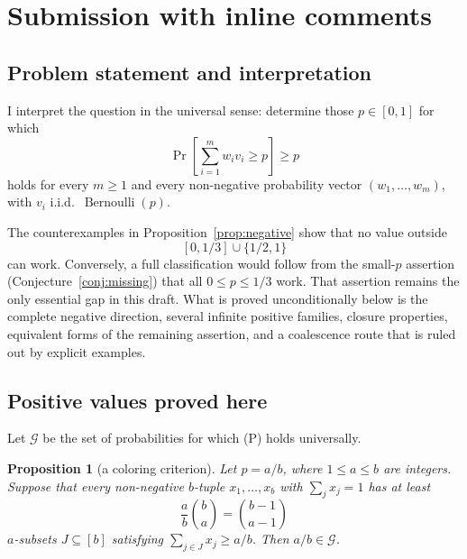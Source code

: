 \documentclass[12pt]{article}
\newtheorem{proposition}{Proposition}
\newcommand{\Ber}{\operatorname{Bernoulli}}
\begin{document}
  \section{Submission with inline comments}


\date{}

\subsection*{Problem statement and interpretation}

I interpret the question in the universal sense: determine those \(p\in[0,1]\)
for which
\[
        \Pr\!\left[\sum_{i=1}^m w_i v_i\ge p\right]\ge p                  \tag{P}
\]
holds for every \(m\ge1\) and every non-negative probability vector
\((w_1,\ldots,w_m)\), with \(v_i\) i.i.d.\ \(\Ber(p)\).

The counterexamples in Proposition~\ref{prop:negative} show that no value
outside
\[
        [0,1/3]\cup\{1/2,1\}
\]
can work.  Conversely, a full classification would follow from the
small-\(p\) assertion (Conjecture~\ref{conj:missing}) that all
\(0\le p\le1/3\) work.  That assertion remains the only essential gap in this
draft.  What is proved unconditionally below is the complete negative direction,
several infinite positive families, closure properties, equivalent forms of the
remaining assertion, and a coalescence route that is ruled out by explicit
examples.

\subsection*{Positive values proved here}

Let \(\mathcal G\) be the set of probabilities for which (P) holds universally.

\begin{proposition}[a coloring criterion]\label{prop:criterion}
Let \(p=a/b\), where \(1\le a\le b\) are integers.  Suppose that every
non-negative \(b\)-tuple \(x_1,\ldots,x_b\) with \(\sum_j x_j=1\) has at least
\[
        \frac{a}{b}\binom ba=\binom{b-1}{a-1}
\]
\(a\)-subsets \(J\subseteq[b]\) satisfying \(\sum_{j\in J}x_j\ge a/b\).  Then
\(a/b\in\mathcal G\).
\end{proposition}
\end{document}
